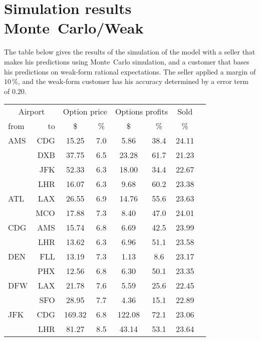 \chapter{Simulation results Monte~Carlo/Weak}
\label{app:SimulationResultsMonteCarloWeak}
The table below gives the results of the simulation of the model with a seller that makes his predictions using Monte~Carlo simulation, and a customer that bases his predictions on weak-form rational expectations. The seller applied a margin of $10\,\%$, and the weak-form customer has his accuracy determined by a error term of $0.20$.
\\[2em]
\begin{table}[h]
    \small
    \begin{center}
        \begin{tabular}{l r c c c c c c}
            \toprule
            \multicolumn{2}{c}{Airport}  & \multicolumn{2}{c}{Option price} & \multicolumn{2}{c}{Options profits}  &  Sold  \\[.4ex]
            from  &  to  &  \$  & \%  &  \$  & \%  & \%  \\
            \midrule
AMS  &  CDG &  15.25  &    7.0  &   5.86  &   38.4  &  24.11  \\
     &  DXB &  37.75  &    6.5  &  23.28  &   61.7  &  21.23  \\
     &  JFK &  52.33  &    6.3  &  18.00  &   34.4  &  22.67  \\
     &  LHR &  16.07  &    6.3  &   9.68  &   60.2  &  23.38  \\[.5ex]
ATL  &  LAX &  26.55  &    6.9  &  14.76  &   55.6  &  23.63  \\
     &  MCO &  17.88  &    7.3  &   8.40  &   47.0  &  24.01  \\[.5ex]
CDG  &  AMS &  15.74  &    6.8  &   6.69  &   42.5  &  23.99  \\
     &  LHR &  13.62  &    6.3  &   6.96  &   51.1  &  23.58  \\[.5ex]
DEN  &  FLL &  13.19  &    7.3  &   1.13  &    8.6  &  23.17  \\
     &  PHX &  12.56  &    6.8  &   6.30  &   50.1  &  23.35  \\[.5ex]
DFW  &  LAX &  21.78  &    7.6  &   5.59  &   25.6  &  22.45  \\
     &  SFO &  28.95  &    7.7  &   4.36  &   15.1  &  22.89  \\[.5ex]
JFK  &  CDG &  169.32  &    6.8  &  122.08  &   72.1  &  23.06  \\
     &  LHR &  81.27  &    8.5  &  43.14  &   53.1  &  23.64  \\[.5ex]

\end{tabular}
\end{center}
\end{table}
